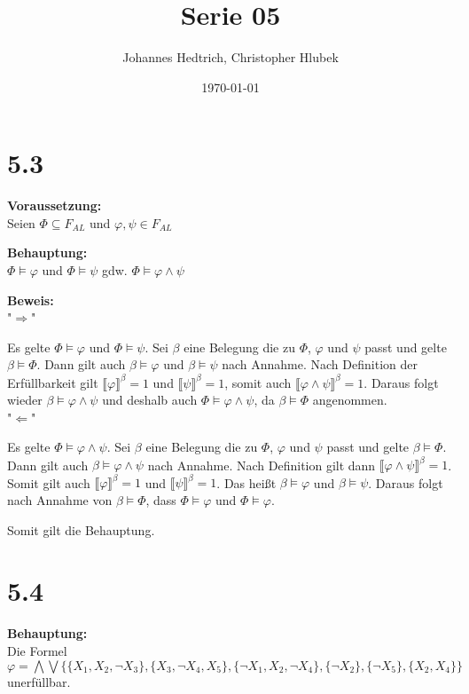 \documentclass[12pt,a4paper]{scrartcl}
\title{Serie 05}
\author{Johannes Hedtrich, Christopher Hlubek}
\date{\today}
\begin{document}
\section*{5.3}

\textbf{Voraussetzung:}\\ 
Seien $\Phi \subseteq F_{AL}$ und $\varphi, \psi \in F_{AL}$

\noindent
\textbf{Behauptung:}\\ 

$\Phi \models \varphi$ und $\Phi \models \psi$ gdw. $\Phi \models \varphi \wedge \psi$

\noindent
\textbf{Beweis:}\\
"$\Rightarrow$"

Es gelte $\Phi \models \varphi$ und $\Phi \models \psi$. Sei $\beta$ eine Belegung die zu
$\Phi$, $\varphi$ und $\psi$ passt und gelte $\beta \models \Phi$. Dann gilt auch
$\beta \models \varphi$ und $\beta \models \psi$ nach Annahme. Nach Definition der
Erfüllbarkeit gilt $\llbracket \varphi \rrbracket^\beta = 1$ und
$\llbracket \psi \rrbracket^\beta = 1$, somit auch
$\llbracket \varphi \wedge \psi \rrbracket^\beta = 1$. Daraus folgt wieder
$\beta \models \varphi \wedge \psi$ und deshalb auch $\Phi \models \varphi \wedge \psi$,
da $\beta \models \Phi$ angenommen.
\\

\noindent
"$\Leftarrow$"

Es gelte $\Phi \models \varphi \wedge \psi$. Sei $\beta$ eine Belegung die zu
$\Phi$, $\varphi$ und $\psi$ passt und gelte $\beta \models \Phi$. Dann gilt auch
$\beta \models \varphi \wedge \psi$ nach Annahme. Nach Definition gilt
dann $\llbracket \varphi \wedge \psi \rrbracket^\beta = 1$. Somit gilt auch
$\llbracket \varphi \rrbracket^\beta = 1$ und
$\llbracket \psi \rrbracket^\beta = 1$. Das heißt $\beta \models \varphi$ und $\beta \models \psi$.
Daraus folgt nach Annahme von $\beta \models \Phi$, dass
$\Phi \models \varphi$ und $\Phi \models \varphi$.

\noindent
Somit gilt die Behauptung.

\section*{5.4}

\textbf{Behauptung:}\\ Die Formel $\varphi = \bigwedge \bigvee\{\{X_1, X_2, \neg X_3\},\{X_3, \neg X_4, X_5\},\{\neg X_1, X_2, \neg X_4\}, \{\neg X_2\},\{\neg X_5\},\{X_2, X_4\}\}$ unerfüllbar.
\end{document}

